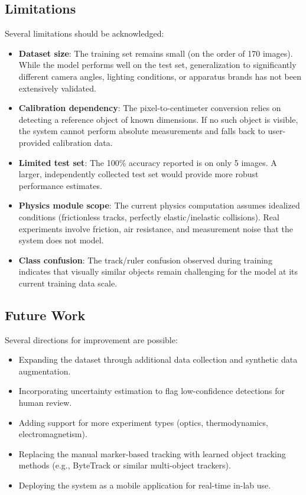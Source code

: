 \documentclass[12pt]{article}
\begin{document}
\subsection{Limitations}

Several limitations should be acknowledged:
\begin{itemize}[noitemsep]
  \item \textbf{Dataset size}: The training set remains small (on the order of 170 images). While the model performs well on the test set, generalization to significantly different camera angles, lighting conditions, or apparatus brands has not been extensively validated.
  \item \textbf{Calibration dependency}: The pixel-to-centimeter conversion relies on detecting a reference object of known dimensions. If no such object is visible, the system cannot perform absolute measurements and falls back to user-provided calibration data.
  \item \textbf{Limited test set}: The 100\% accuracy reported is on only 5 images. A larger, independently collected test set would provide more robust performance estimates.
  \item \textbf{Physics module scope}: The current physics computation assumes idealized conditions (frictionless tracks, perfectly elastic/inelastic collisions). Real experiments involve friction, air resistance, and measurement noise that the system does not model.
  \item \textbf{Class confusion}: The track/ruler confusion observed during training indicates that visually similar objects remain challenging for the model at its current training data scale.
\end{itemize}

\subsection{Future Work}

Several directions for improvement are possible:
\begin{itemize}[noitemsep]
  \item Expanding the dataset through additional data collection and synthetic data augmentation.
  \item Incorporating uncertainty estimation to flag low-confidence detections for human review.
  \item Adding support for more experiment types (optics, thermodynamics, electromagnetism).
  \item Replacing the manual marker-based tracking with learned object tracking methods (e.g., ByteTrack or similar multi-object trackers).
  \item Deploying the system as a mobile application for real-time in-lab use.
\end{itemize}
\end{document}
